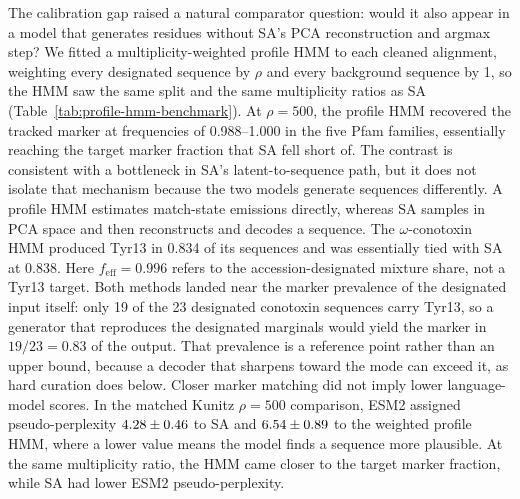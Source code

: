 The calibration gap raised a natural comparator question: would it also appear in a model that
generates residues without SA's PCA reconstruction and argmax step?
We fitted a multiplicity-weighted profile HMM to each cleaned alignment, weighting every
designated sequence by $\rho$ and every background sequence by 1, so the HMM saw the same
split and the same multiplicity ratios as SA (Table~\ref{tab:profile-hmm-benchmark}). At
$\rho=500$, the profile HMM recovered the tracked marker at frequencies of 0.988--1.000 in the
five Pfam families, essentially reaching the target marker fraction that SA fell short of. The
contrast is consistent with a bottleneck in SA's latent-to-sequence path, but it does not isolate
that mechanism because the two models generate sequences differently. A profile HMM estimates
match-state emissions directly, whereas SA samples in PCA space and then reconstructs and
decodes a sequence. The $\omega$-conotoxin HMM produced Tyr13 in 0.834 of
its sequences and was essentially tied with SA at 0.838. Here $f_{\mathrm{eff}}=0.996$ refers
to the accession-designated mixture share, not a Tyr13 target. Both methods landed near
the marker prevalence of the designated input itself: only 19 of the 23 designated conotoxin
sequences carry Tyr13, so a generator that reproduces the designated marginals would yield the
marker in $19/23 = 0.83$ of the output. That prevalence is a reference point rather than an
upper bound, because a decoder that sharpens toward the mode can exceed it, as hard curation
does below. Closer marker matching did not imply lower language-model scores. In the matched
Kunitz $\rho=500$ comparison, ESM2 assigned pseudo-perplexity
$4.28\pm0.46$ to SA and
$6.54\pm0.89$ to the weighted profile HMM, where a lower
value means the model finds a sequence more plausible. At the same multiplicity ratio, the HMM
came closer to the target marker fraction, while SA had lower ESM2 pseudo-perplexity.

\DisplayProfileHMM

